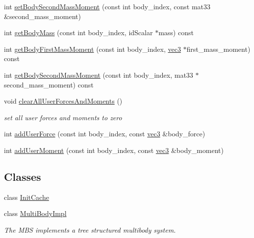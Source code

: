 \begin{CompactItemize}
\item 
int \hyperlink{classbt_inverse_dynamics_1_1_multi_body_tree_f3c9c78481d8ee170e00946c8499c433}{setBodySecondMassMoment} (const int body\_\-index, const mat33 \&second\_\-mass\_\-moment)
\item 
int \hyperlink{classbt_inverse_dynamics_1_1_multi_body_tree_ca41d87e7d3717d7d621eb20ce968b23}{getBodyMass} (const int body\_\-index, idScalar $\ast$mass) const 
\item 
int \hyperlink{classbt_inverse_dynamics_1_1_multi_body_tree_65cf073d371fb6c028649964d21fedce}{getBodyFirstMassMoment} (const int body\_\-index, \hyperlink{classbt_inverse_dynamics_1_1vec3}{vec3} $\ast$first\_\-mass\_\-moment) const 
\item 
int \hyperlink{classbt_inverse_dynamics_1_1_multi_body_tree_be2ffbd34157198fed40e005f7b154ee}{getBodySecondMassMoment} (const int body\_\-index, mat33 $\ast$second\_\-mass\_\-moment) const 
\item 
\hypertarget{classbt_inverse_dynamics_1_1_multi_body_tree_66402f51ab131c39a4d309196ff7c743}{
void \hyperlink{classbt_inverse_dynamics_1_1_multi_body_tree_66402f51ab131c39a4d309196ff7c743}{clearAllUserForcesAndMoments} ()}
\label{classbt_inverse_dynamics_1_1_multi_body_tree_66402f51ab131c39a4d309196ff7c743}

\begin{CompactList}\small\item\em set all user forces and moments to zero \item\end{CompactList}\item 
int \hyperlink{classbt_inverse_dynamics_1_1_multi_body_tree_629ed5024a2d1cb7500ebe935231f5e8}{addUserForce} (const int body\_\-index, const \hyperlink{classbt_inverse_dynamics_1_1vec3}{vec3} \&body\_\-force)
\item 
int \hyperlink{classbt_inverse_dynamics_1_1_multi_body_tree_63096d466e1def1657da8eb3a99850fa}{addUserMoment} (const int body\_\-index, const \hyperlink{classbt_inverse_dynamics_1_1vec3}{vec3} \&body\_\-moment)
\end{CompactItemize}
\subsection*{Classes}
\begin{CompactItemize}
\item 
class \hyperlink{classbt_inverse_dynamics_1_1_multi_body_tree_1_1_init_cache}{InitCache}
\item 
class \hyperlink{classbt_inverse_dynamics_1_1_multi_body_tree_1_1_multi_body_impl}{MultiBodyImpl}
\begin{CompactList}\small\item\em The MBS implements a tree structured multibody system. \item\end{CompactList}\end{CompactItemize}


